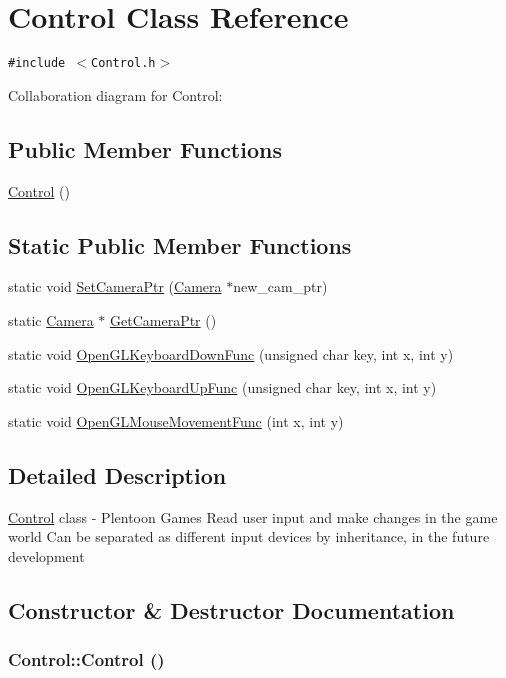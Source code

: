 \hypertarget{class_control}{
\section{Control Class Reference}
\label{class_control}
}
{\tt \#include $<$Control.h$>$}

Collaboration diagram for Control:\subsection*{Public Member Functions}
\begin{CompactItemize}
\item 
\hyperlink{class_control_a730aeda4517f40bc48ba1e46ebded77}{Control} ()
\end{CompactItemize}
\subsection*{Static Public Member Functions}
\begin{CompactItemize}
\item 
static void \hyperlink{class_control_8505fd512015d12eee7dff4c986cbbc6}{SetCameraPtr} (\hyperlink{class_camera}{Camera} $\ast$new\_\-cam\_\-ptr)
\item 
static \hyperlink{class_camera}{Camera} $\ast$ \hyperlink{class_control_5785fa3a36503f7ebda1d5e6e1760223}{GetCameraPtr} ()
\item 
static void \hyperlink{class_control_350ec7cf720a55964bdde6a0ddf4b7bf}{OpenGLKeyboardDownFunc} (unsigned char key, int x, int y)
\item 
static void \hyperlink{class_control_c822fb376b27f30d756bbb2643ec6250}{OpenGLKeyboardUpFunc} (unsigned char key, int x, int y)
\item 
static void \hyperlink{class_control_ff386577c26a1672e516606a423320d3}{OpenGLMouseMovementFunc} (int x, int y)
\end{CompactItemize}


\subsection{Detailed Description}
\hyperlink{class_control}{Control} class - Plentoon Games Read user input and make changes in the game world Can be separated as different input devices by inheritance, in the future development 

\subsection{Constructor \& Destructor Documentation}
\hypertarget{class_control_a730aeda4517f40bc48ba1e46ebded77}{
\subsubsection[Control]{\setlength{\rightskip}{0pt plus 5cm}Control::Control ()}}
\label{class_control_a730aeda4517f40bc48ba1e46ebded77}


